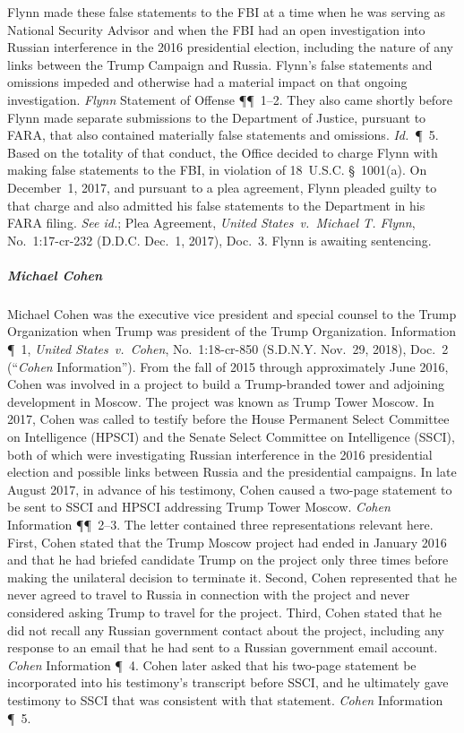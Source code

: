 Flynn made these false statements to the FBI at a time when he was serving as National Security Advisor and when the FBI had an open investigation into Russian interference in the 2016 presidential election, including the nature of any links between the Trump Campaign and Russia.
Flynn's false statements and omissions impeded and otherwise had a material impact on that ongoing investigation.
\textit{Flynn} Statement of Offense \P\P~1--2.
They also came shortly before Flynn made separate submissions to the Department of Justice, pursuant to FARA, that also contained materially false statements and omissions.
\textit{Id.}~\P~5.
Based on the totality of that conduct, the Office decided to charge Flynn with making false statements to the FBI, in violation of 18~U.S.C. \S~1001(a).
On December~1, 2017, and pursuant to a plea agreement, Flynn pleaded guilty to that charge and also admitted his false statements to the Department in his FARA filing.
\textit{See id.}; Plea Agreement, \textit{United States~v.\ Michael T. Flynn}, No.~1:17-cr-232 (D.D.C. Dec.~1, 2017), Doc.~3.
Flynn is awaiting sentencing.

\subparagraph{Michael Cohen}
Michael Cohen was the executive vice president and special counsel to the Trump Organization when Trump was president of the Trump Organization.
Information \P~1, \textit{United States~v.\ Cohen}, No.~1:18-cr-850 (S.D.N.Y. Nov.~29, 2018), Doc.~2 (``\textit{Cohen} Information'').
From the fall of 2015 through approximately June 2016, Cohen was involved in a project to build a Trump-branded tower and adjoining development in Moscow.
The project was known as Trump Tower Moscow.
In 2017, Cohen was called to testify before the House Permanent Select Committee on Intelligence (HPSCI) and the Senate Select Committee on Intelligence (SSCI), both of which were investigating Russian interference in the 2016 presidential election and possible links between Russia and the presidential campaigns.
In late August 2017, in advance of his testimony, Cohen caused a two-page statement to be sent to SSCI and HPSCI addressing Trump Tower Moscow.
\textit{Cohen} Information \P\P~2--3.
The letter contained three representations relevant here.
First, Cohen stated that the Trump Moscow project had ended in January 2016 and that he had briefed candidate Trump on the project only three times before making the unilateral decision to terminate it.
Second, Cohen represented that he never agreed to travel to Russia in connection with the project and never considered asking Trump to travel for the project.
Third, Cohen stated that he did not recall any Russian government contact about the project, including any response to an email that he had sent to a Russian government email account.
\textit{Cohen} Information \P~4.
Cohen later asked that his two-page statement be incorporated into his testimony's transcript before SSCI, and he ultimately gave testimony to SSCI that was consistent with that statement.
\textit{Cohen} Information \P~5.

